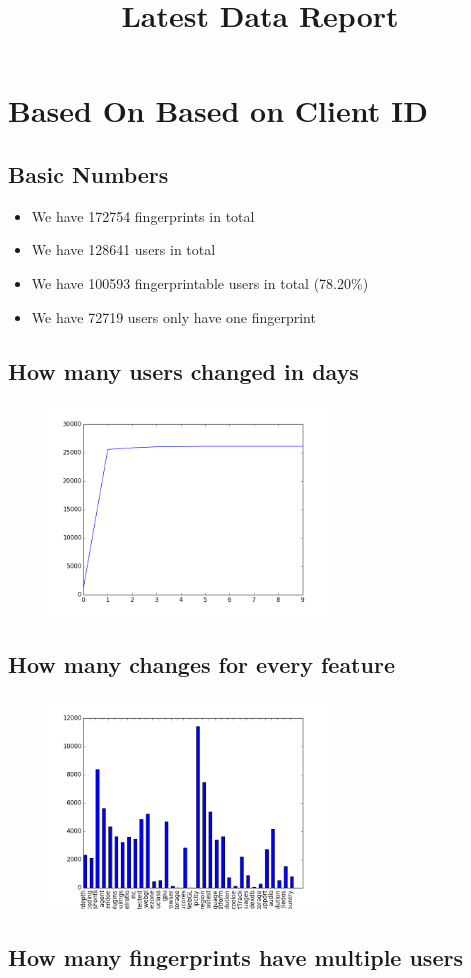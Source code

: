 \documentclass[10pt, conference, compsocconf]{IEEEtran}
\begin{document}
\title{Latest Data Report}
\author{
}
\maketitle
\section{Based On Based on Client ID}
\subsection{Basic Numbers}
\begin{itemize}\item We have 172754 fingerprints in total\item We have 128641 users in total\item We have 100593 fingerprintable users in total (78.20\%)\item We have 72719 users only have one fingerprint \end{itemize}\subsection{How many users changed in days}
\begin{figure}[H]\centering\includegraphics[width=75mm,scale=0.5]{BasedonClientIDchangebytime}\end{figure}\subsection{How many changes for every feature}
\begin{figure}[H]\centering\includegraphics[width=75mm,scale=0.5]{BasedonClientIDfeaturechange}\end{figure}\subsection{How many fingerprints have multiple users}
\end{document}
